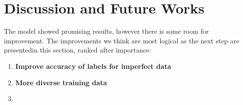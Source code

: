 \section{Discussion and Future Works}
The model showed promising results, however there is some room for improvement. The improvements we think are most logical as the next step are presentedin this section, ranked after importance:

\begin{enumerate}
  \item \textbf{Improve accuracy of labels for imperfect data}
  \item \textbf{More diverse training data}
  \item \textbf{}
\end{enumerate}